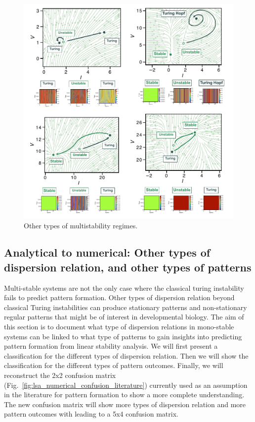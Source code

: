 \begin{figure}[H] %
    \centering
    \begin{adjustbox}{center}
    \includegraphics[width=1.4\textwidth]{chapters/Chapter 1/multistability_leftover} %
    \end{adjustbox}
    \caption{Other types of multistability regimes.}
    \label{fig:multistability_leftover} %
\end{figure}


\subsection{Analytical to numerical: Other types of dispersion relation, and other types of patterns} \label{nogrowth}
Multi-stable systems are not the only case where the classical turing instability fails to predict pattern formation.
Other types of dispersion relation beyond classical Turing instabilities can produce stationary patterns and non-stationary regular patterns that might be of interest in developmental biology.
The aim of this section is to document what type of dispersion relations in mono-stable systems can be linked to what type of patterns to gain insights into predicting pattern formation from linear stability analysis.
We will first present a classification for the different types of dispersion relation.
Then we will show the classification for the different types of pattern outcomes.
Finally, we will reconstruct the 2x2 confusion matrix (Fig.~\ref{fig:lsa_numerical_confusion_literature}) currently used as an assumption in the literature for pattern formation to show a more complete understanding. The new confusion matrix will show more types of dispersion relation and more pattern outcomes with leading to a 5x4 confusion matrix.

